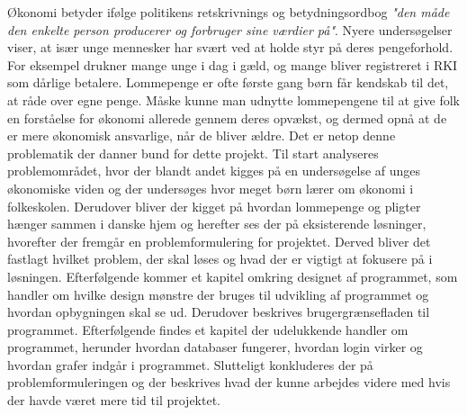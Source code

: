 Økonomi betyder ifølge politikens retskrivnings og betydningsordbog \textit{"den måde den enkelte person producerer og forbruger sine værdier på"}. Nyere undersøgelser viser, at især unge mennesker har svært ved at holde styr på deres pengeforhold. For eksempel drukner mange unge i dag i gæld, og mange bliver registreret i RKI som dårlige betalere.
Lommepenge er ofte første gang børn får kendskab til det, at råde over egne penge. Måske kunne man udnytte lommepengene til at give folk en forståelse for økonomi allerede gennem deres opvækst, og dermed opnå at de er mere økonomisk ansvarlige, når de bliver ældre. Det er netop denne problematik der danner bund for dette projekt.
Til start analyseres problemområdet, hvor der blandt andet kigges på en undersøgelse af unges økonomiske viden og der undersøges hvor meget børn lærer om økonomi i folkeskolen. Derudover bliver der kigget på hvordan lommepenge og pligter hænger sammen i danske hjem og herefter ses der på eksisterende løsninger, hvorefter der fremgår en problemformulering for projektet.
Derved bliver det fastlagt hvilket problem, der skal løses og hvad der er vigtigt at fokusere på i løsningen. Efterfølgende kommer et kapitel omkring designet af programmet, som handler om hvilke design mønstre der bruges til udvikling af programmet og hvordan opbygningen skal se ud. Derudover beskrives brugergrænsefladen til programmet. Efterfølgende findes et kapitel der udelukkende handler om programmet, herunder hvordan databaser fungerer, hvordan login virker og hvordan grafer indgår i programmet. Slutteligt konkluderes der på problemformuleringen og der beskrives hvad der kunne arbejdes videre med hvis der havde været mere tid til projektet. 

